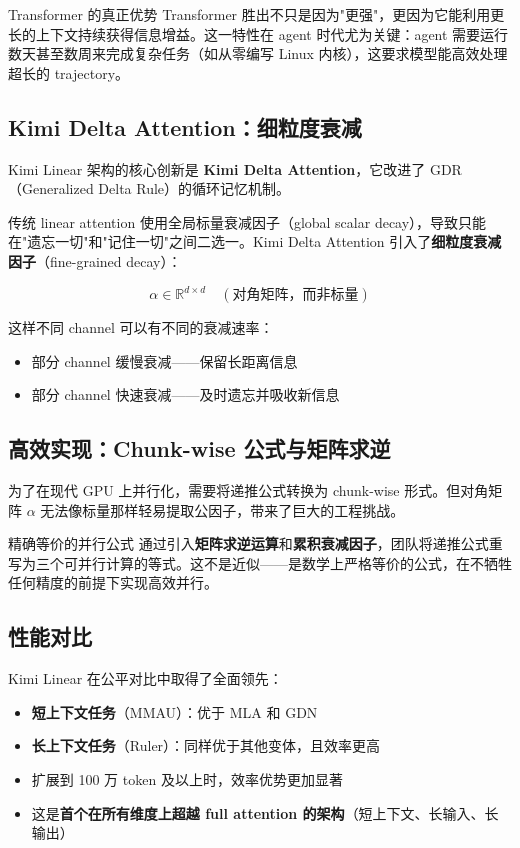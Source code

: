 \documentclass[a4paper]{article}
\begin{document}
\begin{knowledgebox}{Transformer 的真正优势}
Transformer 胜出不只是因为"更强"，更因为它能利用更长的上下文持续获得信息增益。这一特性在 agent 时代尤为关键：agent 需要运行数天甚至数周来完成复杂任务（如从零编写 Linux 内核），这要求模型能高效处理超长的 trajectory。
\end{knowledgebox}

\subsection{Kimi Delta Attention：细粒度衰减}

Kimi Linear 架构的核心创新是 \textbf{Kimi Delta Attention}，它改进了 GDR（Generalized Delta Rule）的循环记忆机制。

传统 linear attention 使用全局标量衰减因子（global scalar decay），导致只能在"遗忘一切"和"记住一切"之间二选一。Kimi Delta Attention 引入了\textbf{细粒度衰减因子}（fine-grained decay）：

$$\alpha \in \mathbb{R}^{d \times d} \quad (\text{对角矩阵，而非标量})$$

这样不同 channel 可以有不同的衰减速率：
\begin{itemize}
    \item 部分 channel 缓慢衰减——保留长距离信息
    \item 部分 channel 快速衰减——及时遗忘并吸收新信息
\end{itemize}

\subsection{高效实现：Chunk-wise 公式与矩阵求逆}

为了在现代 GPU 上并行化，需要将递推公式转换为 chunk-wise 形式。但对角矩阵 $\alpha$ 无法像标量那样轻易提取公因子，带来了巨大的工程挑战。

\begin{importantbox}{精确等价的并行公式}
通过引入\textbf{矩阵求逆运算}和\textbf{累积衰减因子}，团队将递推公式重写为三个可并行计算的等式。这不是近似——是数学上严格等价的公式，在不牺牲任何精度的前提下实现高效并行。
\end{importantbox}

\subsection{性能对比}

Kimi Linear 在公平对比中取得了全面领先：
\begin{itemize}
    \item \textbf{短上下文任务}（MMAU）：优于 MLA 和 GDN
    \item \textbf{长上下文任务}（Ruler）：同样优于其他变体，且效率更高
    \item 扩展到 100 万 token 及以上时，效率优势更加显著
    \item 这是\textbf{首个在所有维度上超越 full attention 的架构}（短上下文、长输入、长输出）
\end{itemize}
\end{document}
